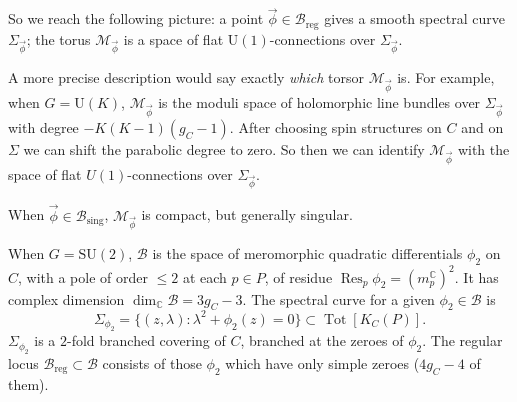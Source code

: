 \documentclass[12pt,letterpaper,reqno]{article}
\numberwithin{equation}{section}
\newcommand{\cB}{\ensuremath{\mathcal B}}
\newcommand{\cM}{\ensuremath{\mathcal M}}
\newcommand{\bbC}{\ensuremath{\mathbb C}}
\newcommand{\half}{\ensuremath{\frac{1}{2}}}
\newcommand{\sing}{\mathrm{sing}}
\newcommand{\reg}{\mathrm{reg}}
\newcommand{\abs}[1]{\lvert#1\rvert}
\newcommand{\vphi}{{\vec\phi}}
\newcommand{\ti}[1]{\textit{#1}}
\DeclareMathOperator{\Res}{Res}
\DeclareMathOperator{\Tot}{Tot}
\newcommand{\SU}{\mathrm{SU}}
\newcommand{\U}{\mathrm{U}}
\begin{document}
So we reach the following picture: a point $\vphi \in \cB_\reg$
gives a smooth spectral curve $\Sigma_\vphi$; the torus
$\cM_\vphi$ is a space of flat $\U(1)$-connections
over $\Sigma_\vphi$.

\begin{remark}[More precise picture of the fibers
when $G = \U(K)$]
A more precise description would say exactly \ti{which} torsor 
$\cM_\vphi$ is. For example, when $G = \U(K)$,
$\cM_\vphi$ is the moduli space of holomorphic line bundles
over $\Sigma_\vphi$ with degree $-K(K-1)(g_C-1)$.
After choosing spin structures on $C$ and on $\Sigma$
we can shift the parabolic degree to zero.
So then we can identify $\cM_\vphi$ with the space of
flat $U(1)$-connections over $\Sigma_\vphi$.
\end{remark}

When $\vphi \in \cB_\sing$, $\cM_\vphi$ is compact,
but generally singular.


\begin{example}[Hitchin base and spectral curves for $G = \SU(2)$]
When $G = \SU(2)$, $\cB$ is the space of meromorphic quadratic
differentials $\phi_2$ on $C$, with a pole of order $\le 2$ at 
each $p \in P$, of residue $\Res_p \phi_2 = (m_p^\bbC)^2$.
It has complex dimension
$\dim_\bbC \cB = 3 g_C - 3$. 
The spectral curve for a given $\phi_2 \in \cB$
is
\begin{equation}
  \Sigma_{\phi_2} = \{(z,\lambda): \lambda^2 + \phi_2(z) = 0\} \subset \Tot[K_C(P)].
\end{equation}
$\Sigma_{\phi_2}$ is a $2$-fold branched covering of $C$, branched at the zeroes of $\phi_2$.
The regular locus $\cB_\reg \subset \cB$ consists of those $\phi_2$ which have only simple zeroes ($4 g_C - 4$ of them).
\end{example}
\end{document}
